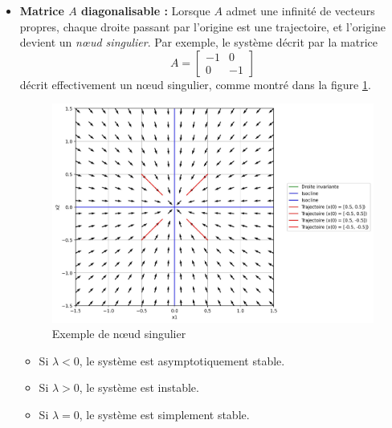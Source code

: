             \begin{itemize}
                \item \textbf{Matrice $A$ diagonalisable :} Lorsque $A$ admet une infinité de vecteurs propres, chaque droite passant par l'origine est une trajectoire, et l'origine devient un \textit{nœud singulier}. Par exemple, le système décrit par la matrice
                \begin{equation}
                    A = \begin{bmatrix} -1 & 0 \\ 0 & -1 \end{bmatrix}
                \end{equation}
                décrit effectivement un nœud singulier, comme montré dans la figure \ref{fig:noeud_singulier}.
                \begin{figure}[ht!]
                    \centering
                    \includegraphics[width=\textwidth]{images/noeud_singulier.jpg}
                    \caption{Exemple de nœud singulier}
                    \label{fig:noeud_singulier}
                \end{figure}
                \begin{itemize}
                    \item Si $\lambda < 0$, le système est asymptotiquement stable.
                    \item Si $\lambda > 0$, le système est instable.
                    \item Si $\lambda = 0$, le système est simplement stable.
                \end{itemize}
            

\end{itemize}
